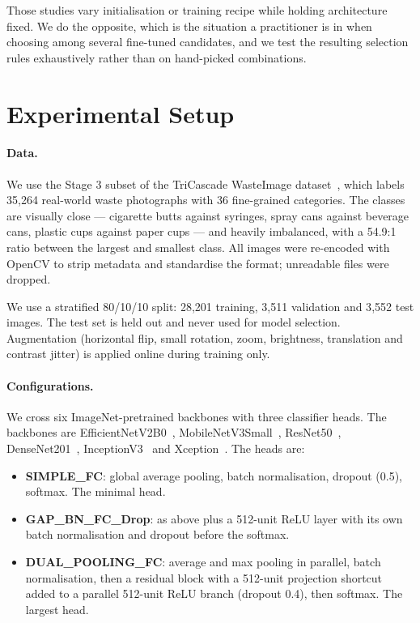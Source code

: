 \documentclass[runningheads]{llncs}
\begin{document}
Those studies vary initialisation or training recipe while holding architecture
fixed. We do the opposite, which is the situation a practitioner is in when
choosing among several fine-tuned candidates, and we test the resulting
selection rules exhaustively rather than on hand-picked combinations.

\section{Experimental Setup}

\paragraph{Data.}
We use the Stage 3 subset of the TriCascade WasteImage
dataset~\cite{tricascade_dataset,nahiduzzaman2025automated}, which labels 35{,}264
real-world waste photographs with 36 fine-grained categories. The classes are
visually close --- cigarette butts against syringes, spray cans against beverage
cans, plastic cups against paper cups --- and heavily imbalanced, with a
54.9:1 ratio between the largest and smallest class. All images were re-encoded
with OpenCV to strip metadata and standardise the format; unreadable files were
dropped.

We use a stratified 80/10/10 split: 28{,}201 training, 3{,}511 validation and
3{,}552 test images. The test set is held out and never used for model
selection. Augmentation (horizontal flip, small rotation, zoom, brightness,
translation and contrast jitter) is applied online during training only.

\paragraph{Configurations.}
We cross six ImageNet-pretrained backbones with three classifier heads. The
backbones are EfficientNetV2B0~\cite{tan2021efficientnetv2},
MobileNetV3Small~\cite{howard2019mobilenetv3}, ResNet50~\cite{he2016resnet},
DenseNet201~\cite{huang2017densenet},
InceptionV3~\cite{szegedy2016inceptionv3} and
Xception~\cite{chollet2017xception}. The heads are:

\begin{itemize}
\item \textbf{SIMPLE\_FC}: global average pooling, batch normalisation, dropout
(0.5), softmax. The minimal head.
\item \textbf{GAP\_BN\_FC\_Drop}: as above plus a 512-unit ReLU layer with its
own batch normalisation and dropout before the softmax.
\item \textbf{DUAL\_POOLING\_FC}: average and max pooling in parallel, batch
normalisation, then a residual block with a 512-unit projection shortcut added
to a parallel 512-unit ReLU branch (dropout 0.4), then softmax. The largest head.
\end{itemize}
\end{document}
